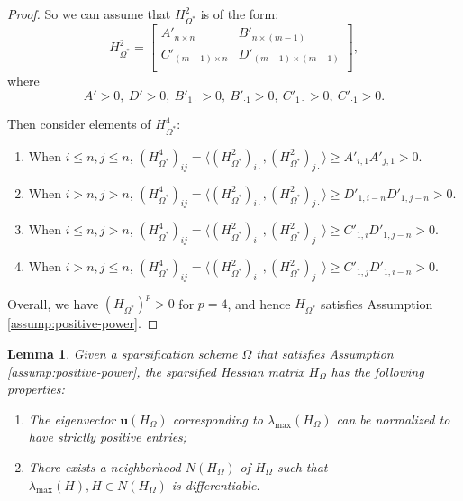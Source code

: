 \documentclass{article}
\theoremstyle{plain}
\newtheorem{lemma}[theorem]{Lemma}
\theoremstyle{definition}
\theoremstyle{remark}
\begin{document}
\begin{proof}
So we can assume that $H_{\Omega^*}^2$ is of the form:
\[
H_{\Omega^*}^2 = \begin{bmatrix}
    A'_{n \times n} & B'_{n \times (m - 1)} \\
    C'_{(m - 1) \times n} & D'_{(m - 1) \times (m - 1)} \\
\end{bmatrix},
\]
where
\[
A' > 0,\ D' > 0,\ B'_{1 \cdot} > 0,\ B'_{\cdot 1} > 0,\ C'_{1 \cdot} > 0,\ C'_{\cdot 1} > 0.
\]

Then consider elements of $H_{\Omega^*}^4$:
\begin{enumerate}[label=\roman*.]
    \item {
        When $i \leq n, j \leq n$, $(H_{\Omega^*}^4)_{ij} = \langle (H_{\Omega^*}^2)_{i \cdot}, (H_{\Omega^*}^2)_{j \cdot} \rangle \geq A'_{i, 1} A'_{j, 1} > 0$.
    }
    \item {
        When $i > n, j > n$, $(H_{\Omega^*}^4)_{ij} = \langle (H_{\Omega^*}^2)_{i \cdot}, (H_{\Omega^*}^2)_{j \cdot} \rangle \geq D'_{1, i-n} D'_{1, j-n} > 0$.
    }
    \item {
        When $i \leq n, j > n$, $(H_{\Omega^*}^4)_{ij} = \langle (H_{\Omega^*}^2)_{i \cdot}, (H_{\Omega^*}^2)_{j \cdot} \rangle \geq C'_{1, i} D'_{1, j-n} > 0$.
    }
    \item {
        When $i > n, j \leq n$, $(H_{\Omega^*}^4)_{ij} = \langle (H_{\Omega^*}^2)_{i \cdot}, (H_{\Omega^*}^2)_{j \cdot} \rangle \geq C'_{1, j} D'_{1, i-n} > 0$.
    }
\end{enumerate}

Overall, we have $(H_{\Omega^*})^p > 0$ for $p=4$, and hence $H_{\Omega^*}$ satisfies Assumption \ref{assump:positive-power}.
\end{proof}

\begin{lemma} \label{lem:eigenvector-positivity-differentiability}
    Given a sparsification scheme $\Omega$ that satisfies Assumption \ref{assump:positive-power}, the sparsified Hessian matrix $H_{\Omega}$ has the following properties:
    \begin{enumerate} %
        \item The eigenvector $\mathbf{u}(H_{\Omega})$ corresponding to $\lambda_{\max}(H_{\Omega})$ can be normalized to have strictly positive entries; 
        \item There exists a neighborhood $N(H_{\Omega})$ of $H_{\Omega}$ such that $\lambda_{\max}(H), H \in N(H_{\Omega})$ is differentiable.
    \end{enumerate}
\end{lemma}
\end{document}
